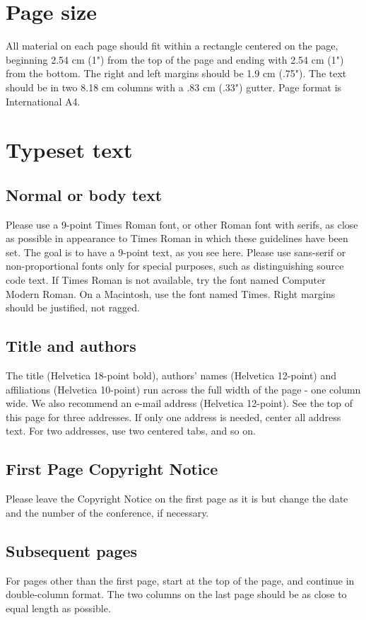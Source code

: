 \documentclass[acmtog, authorversion]{acmart}
\begin{document}
\section{Page size}
All material on each page should fit within a rectangle centered on 
the page, beginning 2.54 cm (1") from the top of the page and ending 
with 2.54 cm (1") from the bottom.  The right and left margins should be 
1.9 cm (.75").  The text should be in two 8.18 cm columns with a .83 cm 
(.33") gutter. Page format is International A4.

\section{Typeset text}
\subsection{Normal or body text}
Please use a 9-point Times Roman font, or other Roman font with 
serifs, as close as possible in appearance to Times Roman in which 
these guidelines have been set. The goal is to have a 9-point text, 
as you see here. Please use sans-serif or non-proportional fonts 
only for special purposes, such as distinguishing source code text. 
If Times Roman is not available, try the font named Computer Modern
Roman. On a Macintosh, use the font named Times. Right margins 
should be justified, not ragged.

\subsection{Title and authors}
The title (Helvetica 18-point bold), authors' names (Helvetica 
12-point) and affiliations (Helvetica 10-point) run across the full 
width of the page - one column wide. We also recommend an  e-mail 
address (Helvetica 12-point). See the top of this page for three 
addresses. If only one address is needed, center all address text. 
For two addresses, use two centered tabs, and so on.

\subsection{First Page Copyright Notice}
Please leave the Copyright Notice on the first page as it is but 
change the date and the number of the conference, if necessary.

\subsection{Subsequent pages}
For pages other than the first page, start at the top of the page, and 
continue in double-column format.  The two columns on the last page 
should be as close to equal length as possible.
\end{document}
